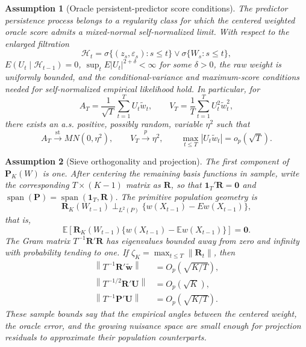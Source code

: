 ﻿\documentclass[11pt]{article}
\newtheorem{assumption}{Assumption}
\begin{document}
\begin{assumption}[Oracle persistent-predictor score conditions]
\label{ass:geo-score}
The predictor persistence process belongs to a regularity class for which the centered weighted oracle score admits a mixed-normal self-normalized limit. With respect to the enlarged filtration
\[
    \mathcal H_t=\sigma\{(z_s,\varepsilon_s):s\leq t\}\vee\sigma\{W_s:s\leq t\},
\]
\(E(U_t\mid\mathcal H_{t-1})=0\), \(\sup_tE|U_t|^{2+\delta}<\infty\) for some \(\delta>0\), the raw weight is uniformly bounded, and the conditional-variance and maximum-score conditions needed for self-normalized empirical likelihood hold. In particular, for
\[
    A_T=\frac1{\sqrt T}\sum_{t=1}^T U_t\widetilde w_t,
    \qquad
    V_T=\frac1T\sum_{t=1}^T U_t^2\widetilde w_t^2,
\]
there exists an a.s. positive, possibly random, variable \(\eta^2\) such that
\begin{equation}
    A_T\xrightarrow{\mathrm{st}}MN(0,\eta^2),
    \qquad
    V_T\xrightarrow{p}\eta^2,
    \qquad
    \max_{t\leq T}|U_t\widetilde w_t|=o_p(\sqrt T).
    \label{eq:geo-oracle}
\end{equation}
\end{assumption}

\begin{assumption}[Sieve orthogonality and projection]
\label{ass:geo-projection}
The first component of \(\bm P_K(W)\) is one. After centering the remaining basis functions in sample, write the corresponding \(T\times(K-1)\) matrix as \(\bm R\), so that \(\bm1_T'\bm R=\bm0\) and \(\operatorname{span}(\bm P)=\operatorname{span}(\bm1_T,\bm R)\). The primitive population geometry is
\[
    \bm R_K(W_{t-1})\perp_{L^2(P)}
    \{w(X_{t-1})-Ew(X_{t-1})\},
\]
that is,
\[
    \mathbb E\left[\bm R_K(W_{t-1})\{w(X_{t-1})-\mathbb Ew(X_{t-1})\}\right]=\bm0.
\]
The Gram matrix \(T^{-1}\bm R'\bm R\) has eigenvalues bounded away from zero and infinity with probability tending to one. If \(\zeta_K=\max_{t\leq T}\|\bm R_t\|\), then
\begin{align}
    \left\|T^{-1}\bm R'\widetilde{\bm w}\right\|&=O_p(\sqrt{K/T}),
      \label{eq:geo-rate-rw}\\
    \left\|T^{-1/2}\bm R'\bm U\right\|&=O_p(\sqrt K),
      \label{eq:geo-rate-ru}\\
    \left\|T^{-1}\bm P'\bm U\right\|&=O_p(\sqrt{K/T}).
      \label{eq:geo-rate-pu}
\end{align}
These sample bounds say that the empirical angles between the centered weight, the oracle error, and the growing nuisance space are small enough for projection residuals to approximate their population counterparts.
\end{assumption}
\end{document}
